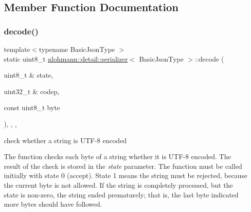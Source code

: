 \subsection{Member Function Documentation}
\mbox{\label{classnlohmann_1_1detail_1_1serializer_a1cc5cb2f6993cefedad087a6cef0e8fb}} 
\subsubsection{\texorpdfstring{decode()}{decode()}}
{\footnotesize\ttfamily template$<$typename Basic\+Json\+Type $>$ \\
static uint8\+\_\+t \hyperlink{classnlohmann_1_1detail_1_1serializer}{nlohmann\+::detail\+::serializer}$<$ Basic\+Json\+Type $>$\+::decode (\begin{DoxyParamCaption}\item[{uint8\+\_\+t \&}]{state,  }\item[{uint32\+\_\+t \&}]{codep,  }\item[{const uint8\+\_\+t}]{byte }\end{DoxyParamCaption})\hspace{0.3cm}{\ttfamily [inline]}, {\ttfamily [static]}, {\ttfamily [private]}, {\ttfamily [noexcept]}}



check whether a string is U\+T\+F-\/8 encoded 

The function checks each byte of a string whether it is U\+T\+F-\/8 encoded. The result of the check is stored in the {\itshape state} parameter. The function must be called initially with state 0 (accept). State 1 means the string must be rejected, because the current byte is not allowed. If the string is completely processed, but the state is non-\/zero, the string ended prematurely; that is, the last byte indicated more bytes should have followed.


